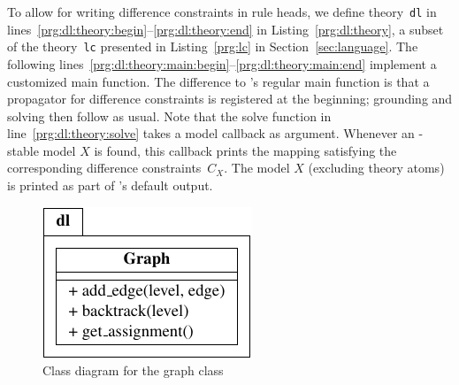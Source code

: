 
To allow for writing difference constraints in rule heads,
we define theory~\lstinline{dl} in lines~\ref{prg:dl:theory:begin}--\ref{prg:dl:theory:end} in Listing~\ref{prg:dl:theory},
a subset of the theory~\lstinline{lc} presented in Listing~\ref{prg:lc} in Section~\ref{sec:language}.
%
The following lines~\ref{prg:dl:theory:main:begin}--\ref{prg:dl:theory:main:end} implement a customized main function.
The difference to \clingo's regular main function is that a propagator for difference constraints is registered at the beginning;
grounding and solving then follow as usual.
%
Note that the solve function in line~\ref{prg:dl:theory:solve} takes a model callback as argument.
Whenever an \IDL-stable model $X$ is found,
this callback prints the mapping satisfying the corresponding difference constraints~$C_X$.
The model $X$ (excluding theory atoms) is printed as part of \clingo's default output.
\begin{figure}[t]
\centering
\includegraphics[]{figures/graph-interface}
\caption{Class diagram for the graph class\label{fig:class:graph}}
\end{figure}

